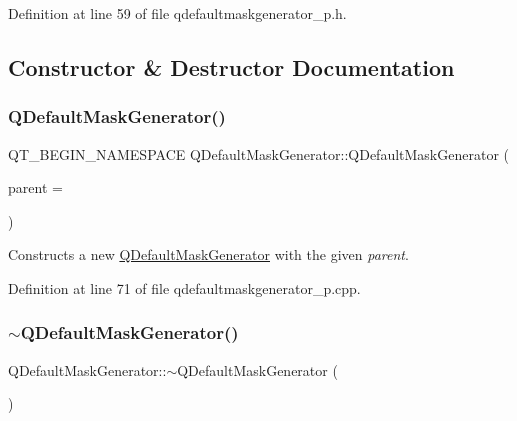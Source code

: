 Definition at line 59 of file qdefaultmaskgenerator\+\_\+p.\+h.



\subsection{Constructor \& Destructor Documentation}
\mbox{\label{class_q_default_mask_generator_a4afe892077be5d2745b9ff857e785b01}} 
\subsubsection{\texorpdfstring{Q\+Default\+Mask\+Generator()}{QDefaultMaskGenerator()}}
{\footnotesize\ttfamily Q\+T\+\_\+\+B\+E\+G\+I\+N\+\_\+\+N\+A\+M\+E\+S\+P\+A\+CE Q\+Default\+Mask\+Generator\+::\+Q\+Default\+Mask\+Generator (\begin{DoxyParamCaption}\item[{Q\+Object $\ast$}]{parent = {} }\end{DoxyParamCaption})\hspace{0.3cm}{\ttfamily [explicit]}}

Constructs a new \mbox{\hyperlink{class_q_default_mask_generator}{Q\+Default\+Mask\+Generator}} with the given {\itshape parent}. 

Definition at line 71 of file qdefaultmaskgenerator\+\_\+p.\+cpp.

\mbox{\label{class_q_default_mask_generator_a36579ef5257207e7ba9ac90360bb4c56}} 
\subsubsection{\texorpdfstring{$\sim$\+Q\+Default\+Mask\+Generator()}{~QDefaultMaskGenerator()}}
{\footnotesize\ttfamily Q\+Default\+Mask\+Generator\+::$\sim$\+Q\+Default\+Mask\+Generator (\begin{DoxyParamCaption}{ }\end{DoxyParamCaption})\hspace{0.3cm}{\ttfamily [virtual]}}


